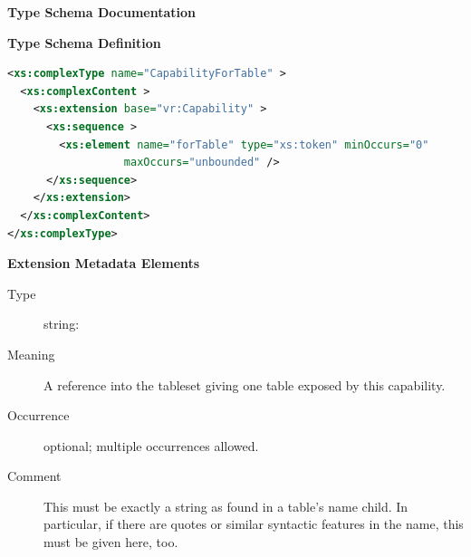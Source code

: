 \documentclass[11pt,a4paper]{ivoa}
\begin{document}
\begin{generated}
\begingroup
        \renewcommand*\descriptionlabel[1]{%
        \hbox to 5.5em{\emph{#1}\hfil}}\vspace{2ex}\noindent\textbf{ Type Schema Documentation}



\vspace{1ex}\noindent\textbf{ Type Schema Definition}

\begin{lstlisting}[language=XML,basicstyle=\footnotesize]
<xs:complexType name="CapabilityForTable" >
  <xs:complexContent >
    <xs:extension base="vr:Capability" >
      <xs:sequence >
        <xs:element name="forTable" type="xs:token" minOccurs="0"
                  maxOccurs="unbounded" />
      </xs:sequence>
    </xs:extension>
  </xs:complexContent>
</xs:complexType>
\end{lstlisting}

\vspace{0.5ex}\noindent\textbf{ Extension Metadata Elements}

\begingroup\small\begin{bigdescription}\item[Element \xmlel{forTable}]
\begin{description}
\item[Type] string: 
\item[Meaning] A reference into the tableset giving one table
                        exposed by this capability.
\item[Occurrence] optional; multiple occurrences allowed.
\item[Comment] This must be exactly a string as found in a
                        table's name child.  In particular, if there are
                        quotes or similar syntactic features in the name,
                        this must be given here, too.

\end{description}


\end{bigdescription}\endgroup

\endgroup
\end{generated}
\end{document}

